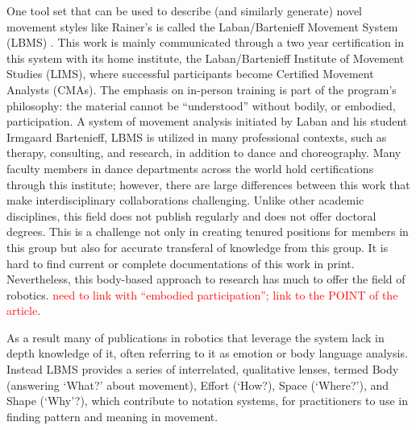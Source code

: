 \documentclass[arts,article,submit,moreauthors,pdftex,10pt,a4paper]{mdpi}
\begin{document}
One tool set that can be used to describe (and similarly generate) novel movement styles like Rainer's is called the Laban/Bartenieff Movement System (LBMS) \cite{laban1971mastery,laban2,laban0,laban1966choreutics,bartenieff1980body,hackney1998making,studd2013}.  This work is mainly communicated through a two year certification in this system with its home institute, the Laban/Bartenieff Institute of Movement Studies (LIMS), where successful participants become Certified Movement Analysts (CMAs).  The emphasis on in-person training is part of the program's philosophy: the material cannot be ``understood'' without bodily, or embodied, participation.
A system of movement analysis initiated by Laban and his student Irmgaard Bartenieff, LBMS is utilized in many professional contexts, such as therapy, consulting, and research, in addition to dance and choreography. 
 Many faculty members in dance departments across the world hold certifications through this institute; however, there are large differences between this work that make interdisciplinary collaborations challenging.  Unlike other academic disciplines, this field does not publish regularly and does not offer doctoral degrees.  This is a challenge not only in creating tenured positions for members in this group but also for accurate transferal of knowledge from this group.  It is hard to find current or complete documentations of this work in print.  
Nevertheless, this body-based approach to research has much to offer the field of robotics.  \textcolor{red}{need to link with ``embodied participation''; link to the POINT of the article}.

As a result many of publications in robotics that leverage the system lack in depth knowledge of it, often referring to it as emotion or body language analysis.  Instead LBMS provides a series of interrelated, qualitative lenses, termed Body (answering `What?' about movement), Effort (`How?), Space (`Where?'), and Shape (`Why'?), which contribute to notation systems, for practitioners to use in finding pattern and meaning in movement.%
\end{document}
